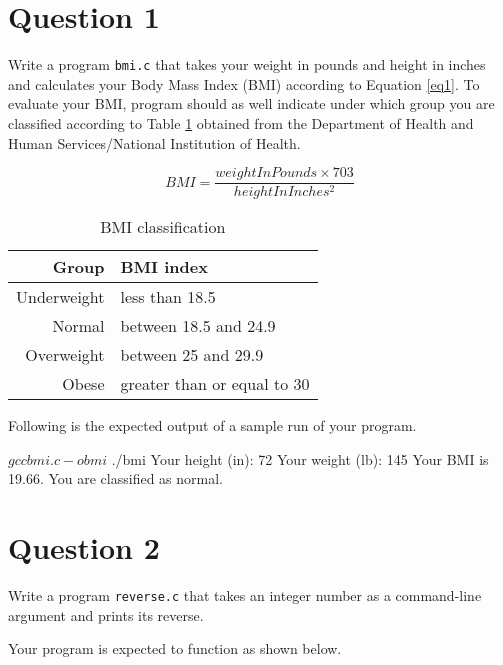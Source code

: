 \documentclass[12pt,letterpaper,twoside]{article}
\begin{document}


\section*{Question 1}

Write a program \texttt{bmi.c} that takes your weight in pounds and height in inches and calculates your Body Mass Index (BMI) according to Equation \ref{eq1}.
To evaluate your BMI, program should as well indicate under which group you are classified according to Table \ref{tab1} obtained from the Department of Health and Human Services/National Institution of Health.

\begin{equation}
BMI = \frac{weightInPounds \times 703}{heightInInches^2}
\label{eq1}
\end{equation}

\begin{table}[H]\centering
\begin{tabular}{|r|l|}
\hline
Group & BMI index \\
\hline
Underweight & less than 18.5 \\
Normal & between 18.5 and 24.9 \\
Overweight & between 25 and 29.9 \\
Obese & greater than or equal to 30 \\
\hline
\end{tabular}
\caption{BMI classification}\label{tab1}
\end{table}

Following is the expected output of a sample run of your program.

\begin{terminal}
$ gcc bmi.c -o bmi
$ ./bmi
Your height (in): 72
Your weight (lb): 145
Your BMI is 19.66.
You are classified as normal.
\end{terminal}

\newpage

\section*{Question 2}

Write a program \texttt{reverse.c} that takes an integer number as a command-line argument and prints its reverse.

Your program is expected to function as shown below.
\end{document}
